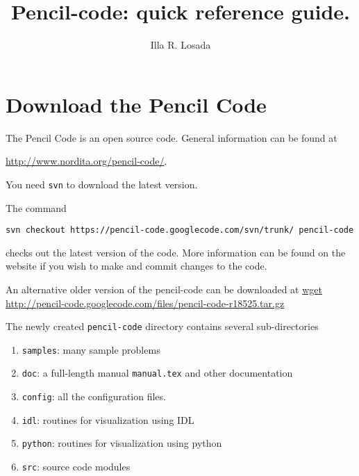 \documentclass[a4paper,12pt]{article}
\title{Pencil-code: quick reference guide.}
\author{Illa R. Losada}
\date{}
\begin{document}
\maketitle

\tableofcontents

\newpage

\section{Download the Pencil Code}
The Pencil Code is an open source code. General information can be found at

\url{http://www.nordita.org/pencil-code/}.


You need \verb|svn| to download the latest version. 


 
The command 
 
\begin{verbatim}
svn checkout https://pencil-code.googlecode.com/svn/trunk/ pencil-code
\end{verbatim}

checks out the latest version of the code. More information can be found on
the website if you wish to make and commit changes to the code.


An alternative older version of the pencil-code can be downloaded at
\url{
wget http://pencil-code.googlecode.com/files/pencil-code-r18525.tar.gz
}

The newly created \verb|pencil-code| directory contains several sub-directories
\begin{enumerate}
  \item \verb|samples|:  many sample problems
  \item \verb|doc|: a full-length manual \verb|manual.tex| and other documentation
  \item \verb|config|: all the configuration files.
  \item \verb|idl|: routines for visualization using IDL
  \item \verb|python|: routines for visualization using python
  \item \verb|src|: source code modules
\end{enumerate}
\end{document}

